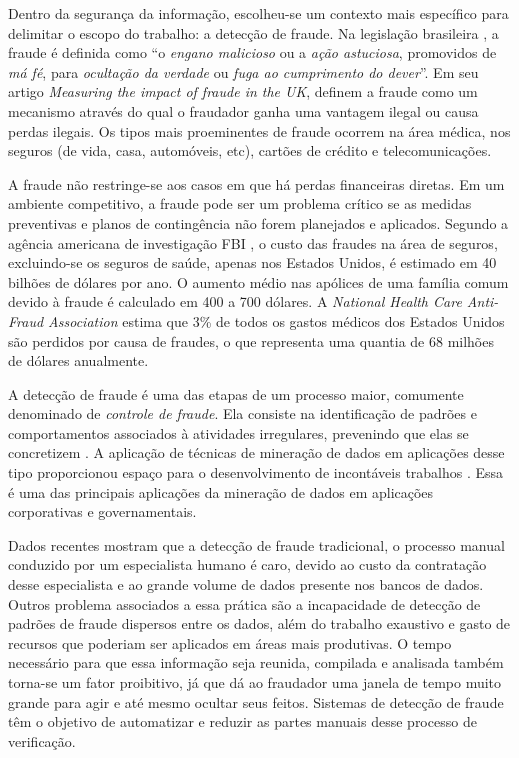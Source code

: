 Dentro da segurança da informação, escolheu-se um contexto mais específico para delimitar o escopo do trabalho: a detecção de fraude. Na legislação brasileira \cite[p. 324]{DePlacido1982}, a fraude é definida como ``o \emph{engano malicioso} ou a \emph{ação astuciosa}, promovidos de \emph{má fé}, para \emph{ocultação da verdade} ou \emph{fuga ao cumprimento do dever}''. Em seu artigo \emph{Measuring the impact of fraude in the UK}, \citet{Levi2008} definem a fraude como um mecanismo através do qual o fraudador ganha uma vantagem ilegal ou causa perdas ilegais. Os tipos mais proeminentes de fraude ocorrem na área médica, nos seguros (de vida, casa, automóveis, etc), cartões de crédito e telecomunicações.

A fraude não restringe-se aos casos em que há perdas financeiras diretas. Em um ambiente competitivo, a fraude pode ser um problema crítico se as medidas preventivas e planos de contingência não forem planejados e aplicados. Segundo a agência americana de investigação FBI \cite{FBI2010}, o custo das fraudes na área de seguros, excluindo-se os seguros de saúde, apenas nos Estados Unidos, é estimado em 40 bilhões de dólares por ano. O aumento médio nas apólices de uma família comum devido à fraude é calculado em 400 a 700 dólares. A \emph{National Health Care Anti-Fraud Association} estima que 3\% de todos os gastos médicos dos Estados Unidos são perdidos por causa de fraudes, o que representa uma quantia de 68 milhões de dólares anualmente.

A detecção de fraude é uma das etapas de um processo maior, comumente denominado de \emph{controle de fraude}. Ela consiste na identificação de padrões e comportamentos associados à atividades irregulares, prevenindo que elas se concretizem \cite{Phua2010}. A aplicação de técnicas de mineração de dados em aplicações desse tipo proporcionou espaço para o desenvolvimento de incontáveis trabalhos \cite{Phua2010}. Essa é uma das principais aplicações da mineração de dados em aplicações corporativas e governamentais.

Dados recentes mostram que a detecção de fraude tradicional, o processo manual conduzido por um especialista humano é caro, devido ao custo da contratação desse especialista e ao grande volume de dados presente nos bancos de dados. Outros problema associados a essa prática são a incapacidade de detecção de padrões de fraude dispersos entre os dados, além do trabalho exaustivo e gasto de recursos que poderiam ser aplicados em áreas mais produtivas. O tempo necessário para que essa informação seja reunida, compilada e analisada também torna-se um fator proibitivo, já que dá ao fraudador uma janela de tempo muito grande para agir e até mesmo ocultar seus feitos. Sistemas de detecção de fraude têm o objetivo de automatizar e reduzir as partes manuais desse processo de verificação.

